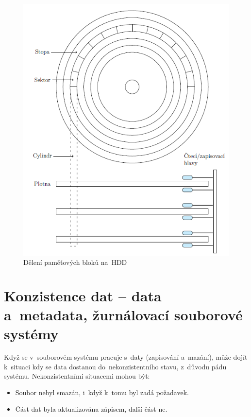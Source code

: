 \begin{figure}[ht]
	\centering
	\includegraphics[scale=1]{images/mem_hdd.png}
	\caption{Dělení paměťových bloků na~HDD}
	\label{mem_hdd}
\end{figure}


\clearpage
\section{Konzistence dat -- data a~metadata, žurnálovací souborové systémy}

Když se v~souborovém systému pracuje s~daty (zapisování a~mazání), může dojít k~situaci kdy se data dostanou do~nekonzistentního stavu, z~důvodu pádu systému. Nekonzistentními situacemi mohou být:

\begin{itemize}
	\item Soubor nebyl smazán, i~když k~tomu byl zadá požadavek.
	\item Část dat byla aktualizována zápisem, další část ne.
\end{itemize}

